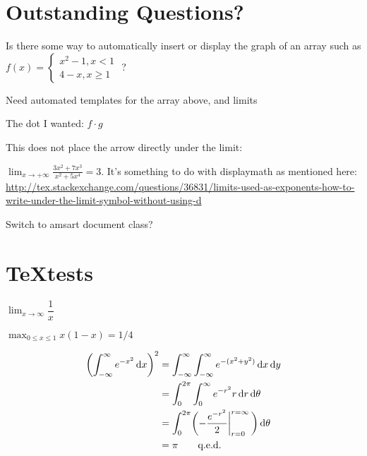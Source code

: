 \documentclass[12pt]{article}
\newcommand*\diff{\mathop{}\!\mathrm{d}}
\begin{document}
\section{Outstanding Questions?}

Is there some way to automatically insert or display the graph of an array such as $f(x) = \left\{\begin{array}{l}
x^2-1,x < 1\\
4-x, x \geq 1
\end{array} \right. $ ?

Need automated templates for the array above, and limits

The dot I wanted: $f\cdot g$

This does not place the arrow directly under the limit:


$ \lim_{x \to +\infty} \frac{3x^2 +7x^3}{x^2 +5x^4} = 3. $
It's something to do with displaymath as mentioned here:
\url{http://tex.stackexchange.com/questions/36831/limits-used-as-exponents-how-to-write-under-the-limit-symbol-without-using-d}

Switch to amsart document class?

\section{\TeX tests}

$\lim_{x\to\infty}\dfrac{1}{x}$

 $\max_{0\le x\le 1}x(1-x)=1/4$


\begin{align*}
\biggl(\int_{-\infty}^\infty e^{-x^2}\diff x\biggr)^2 
  &= \int_{-\infty}^\infty\int_{-\infty}^\infty e^{-(x^2+y^2)}\diff x\diff y \\
  &= \int_0^{2\pi}\int_0^\infty e^{-r^2}r\diff r\diff\theta                  \\
  &= \int_0^{2\pi}\biggl(-{e^{-r^2}\over2}\bigg\vert_{r=0}^{r=\infty}\,\biggr)\diff\theta\\
  &= \pi                                          \tag*{q.e.d.}
\end{align*}
\end{document}
